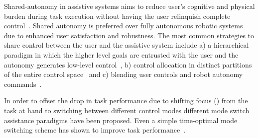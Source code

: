 Shared-autonomy in assistive systems aims to reduce user's cognitive and physical burden during task execution without having the user relinquish complete control~\cite{philips2007adaptive,demeester2008user, gopinath2017human, muelling2017autonomy}. Shared autonomy is preferred over fully autonomous robotic systems due to enhanced user satisfaction and robustness. The most common strategies to share control between the user and the assistive system include a) a hierarchical paradigm in which the higher level goals are entrusted with the user and the autonomy generates low-level control~\cite{tsui2011want, kim2010relationship, kim2012autonomy}, b) control allocation in distinct partitions of the entire control space~\cite{driessen2005collaborative} and c) blending user controls and robot autonomy commands~\cite{downey2016blending, storms2014blending, muelling2017autonomy}. 

In order to offset the drop in task performance due to shifting focus () from the task at hand to switching between different control modes different mode switch assistance paradigms have been proposed. Even a simple time-optimal mode switching scheme has shown to improve task performance~\cite{herlant2016assistive}. 

